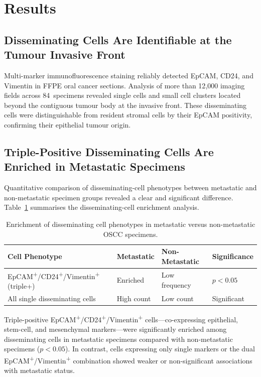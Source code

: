 \documentclass[11pt,a4paper]{article}
\begin{document}
\section{Results}

\subsection{Disseminating Cells Are Identifiable at the Tumour Invasive Front}

Multi-marker immunofluorescence staining reliably detected EpCAM, CD24, and Vimentin in FFPE oral cancer sections. Analysis of more than 12{,}000 imaging fields across 84~specimens revealed single cells and small cell clusters located beyond the contiguous tumour body at the invasive front. These disseminating cells were distinguishable from resident stromal cells by their EpCAM positivity, confirming their epithelial tumour origin.

\subsection{Triple-Positive Disseminating Cells Are Enriched in Metastatic Specimens}

Quantitative comparison of disseminating-cell phenotypes between metastatic and non-metastatic specimen groups revealed a clear and significant difference. Table~\ref{tab:enrichment} summarises the disseminating-cell enrichment analysis.

\begin{table}[ht]
\centering
\caption{Enrichment of disseminating cell phenotypes in metastatic versus non-metastatic OSCC specimens.}
\label{tab:enrichment}
\begin{tabular}{@{}llll@{}}
\toprule
Cell Phenotype & Metastatic & Non-Metastatic & Significance \\
\midrule
EpCAM\textsuperscript{+}/CD24\textsuperscript{+}/Vimentin\textsuperscript{+} (triple+) & Enriched & Low frequency & $p < 0.05$ \\
All single disseminating cells & High count & Low count & Significant \\
\bottomrule
\end{tabular}
\end{table}

Triple-positive EpCAM\textsuperscript{+}/CD24\textsuperscript{+}/Vimentin\textsuperscript{+} cells---co-expressing epithelial, stem-cell, and mesenchymal markers---were significantly enriched among disseminating cells in metastatic specimens compared with non-metastatic specimens ($p < 0.05$). In contrast, cells expressing only single markers or the dual EpCAM\textsuperscript{+}/Vimentin\textsuperscript{+} combination showed weaker or non-significant associations with metastatic status.
\end{document}
